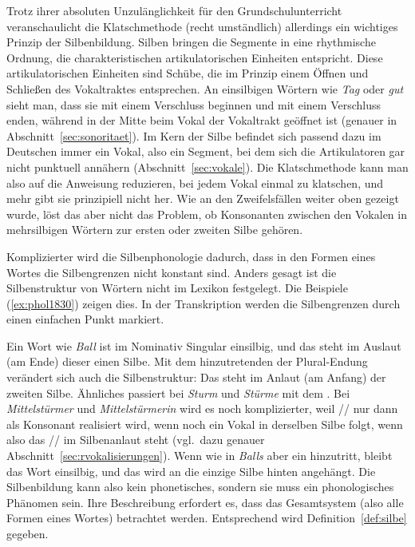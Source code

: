 Trotz ihrer absoluten Unzulänglichkeit für den Grundschulunterricht veranschaulicht die Klatschmethode (recht umständlich) allerdings ein wichtiges Prinzip der Silbenbildung.
Silben bringen die Segmente in eine rhythmische Ordnung, die charakteristischen artikulatorischen Einheiten entspricht.
Diese artikulatorischen Einheiten sind Schübe, die im Prinzip einem Öffnen und Schließen des Vokaltraktes entsprechen.
An einsilbigen Wörtern wie \textit{Tag} \textipa{[ta:k]} oder \textit{gut} \textipa{[gu:t]} sieht man, dass sie mit einem Verschluss beginnen und mit einem Verschluss enden, während in der Mitte beim Vokal der Vokaltrakt geöffnet ist (genauer in Abschnitt~\ref{sec:sonoritaet}).
Im Kern der Silbe befindet sich passend dazu im Deutschen immer ein Vokal, also ein Segment, bei dem sich die Artikulatoren gar nicht punktuell annähern (Abschnitt~\ref{sec:vokale}).
Die Klatschmethode kann man also auf die Anweisung reduzieren, bei jedem Vokal einmal zu klatschen, und mehr gibt sie prinzipiell nicht her.
Wie an den Zweifelsfällen weiter oben gezeigt wurde, löst das aber nicht das Problem, ob Konsonanten zwischen den Vokalen in mehrsilbigen Wörtern zur ersten oder zweiten Silbe gehören.

Komplizierter wird die Silbenphonologie dadurch, dass in den Formen eines Wortes die Silbengrenzen nicht konstant sind.
Anders gesagt ist die Silbenstruktur von Wörtern nicht im Lexikon festgelegt.
Die Beispiele (\ref{ex:phol1830}) zeigen dies.
In der Transkription werden die Silbengrenzen durch einen einfachen Punkt markiert.

\begin{exe}
  \ex\label{ex:phol1830}
  \begin{xlist}
  \end{xlist}
\end{exe}

Ein Wort wie \textit{Ball} ist im Nominativ Singular einsilbig, und das \textipa{[l]} steht im Auslaut (am Ende) dieser einen Silbe.
Mit dem hinzutretenden \textipa{[@]} der Plural-Endung verändert sich auch die Silbenstruktur:
Das \textipa{[l]} steht im Anlaut (am Anfang) der zweiten Silbe.
Ähnliches passiert bei \textit{Sturm} und \textit{Stürme} mit dem \textipa{[m]}.
Bei \textit{Mittelstürmer} \textipa{[mI.t@l.St\t{Y@}.m5]} und \textit{Mittelstürmerin} \textipa{[mI.t@l.St\t{Y@}.m@.KIn]} wird es noch komplizierter, weil // nur dann als Konsonant \textipa{[K]} realisiert wird, wenn noch ein Vokal in derselben Silbe folgt, wenn also das // im Silbenanlaut steht (vgl.\ dazu genauer Abschnitt~\ref{sec:rvokalisierungen}).
Wenn wie in \textit{Balls} aber ein \textipa{[s]} hinzutritt, bleibt das Wort einsilbig, und das \textipa{[s]} wird an die einzige Silbe hinten angehängt.
Die Silbenbildung kann also kein phonetisches, sondern sie muss ein phonologisches Phänomen sein.
Ihre Beschreibung erfordert es, dass das Gesamtsystem (also \zB alle Formen eines Wortes) betrachtet werden.
Entsprechend wird Definition~\ref{def:silbe} gegeben.


